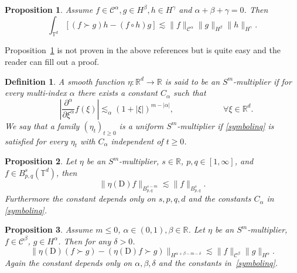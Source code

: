 \documentclass[11pt]{article}
\newcommand{\mathD}{\mathrm{D}}
\newtheorem{definition}{Definition}
\newtheorem{proposition}{Proposition}
{\theorembodyfont{\rmfamily}\newtheorem{remark}{Remark}}
\newcommand{\VV}{\mathscr{C}}
\begin{document}
\begin{proposition}
  \label{adjointparaproduct}Assume $f \in \VV^{\alpha}, g \in H^{\beta}, h \in
  H^{\gamma}$ and $\alpha + \beta + \gamma = 0$. Then
  \[ \int_{\mathbb{T}^d} [(f \succ g) h - (f \circ h) g] \lesssim \| f
     \|_{\VV^{\alpha}} \| g \|_{H^{\beta}} \| h \|_{H^{\gamma}} . \]
\end{proposition}

\begin{remark}
  Proposition~\ref{adjointparaproduct} is not proven in the above references
  but is quite easy and the reader can fill out a proof.
\end{remark}

\begin{definition}
  A smooth function $\eta : \mathbb{R}^d \rightarrow \mathbb{R}$ is said to be
  an $S^m$-multiplier if for every multi-index $\alpha$ there exists a
  constant $C_{\alpha}$ such that
  \begin{equation}
    \quad \left| \frac{\partial^{\alpha}}{\partial \xi^{\alpha}} f (\xi)
    \right| \lesssim_{\alpha} (1 + | \xi |)^{m - | \alpha |}, \qquad \qquad
    \qquad \forall \xi \in \mathbb{R}^d . \label{symbolinq}
  \end{equation}
  We say that a family $(\eta_t)_{t \geqslant 0}$ is a uniform
  $S^m$-multiplier if {\eqref{symbolinq}} is satisfied for every $\eta_t$ with
  $C_{\alpha}$ independent of $t \geqslant 0$. 
\end{definition}

\begin{proposition}
  \label{multiplierestimate}Let $\eta$ be an $S^m$-multiplier, $s \in
  \mathbb{R}$, $p, q \in [1, \infty]$, and $f \in B_{p, q}^s (\mathbb{T}^d)$,
  then
  \[ \| \eta (\mathD) f \|_{B_{p, q}^{s - m}} \lesssim \| f \|_{B_{p, q}^s} .
  \]
  Furthermore the constant depends only on $s, p, q, d$ and the constants
  $C_{\alpha}$ in {\eqref{symbolinq}}.
\end{proposition}

\begin{proposition}
  \label{paraproductleibniz}Assume $m \leqslant 0$, $\alpha \in (0, 1), \beta
  \in \mathbb{R}$. Let $\eta$ be an $S^m$-multiplier, $f \in \VV^{\beta}$, $g
  \in H^{\alpha}$. Then for any $\delta > 0$.
  \[ \| \eta (\mathD) (f \succ g) - (\eta (\mathD) f \succ g) \|_{H^{\alpha +
     \beta - m - \delta}} \lesssim \| f \|_{\VV^{\beta}} \| g \|_{H^{\alpha}}
     . \]
  Again the constant depends only on $\alpha, \beta, \delta$ and the constants
  in~{\eqref{symbolinq}}.
\end{proposition}
\end{document}
